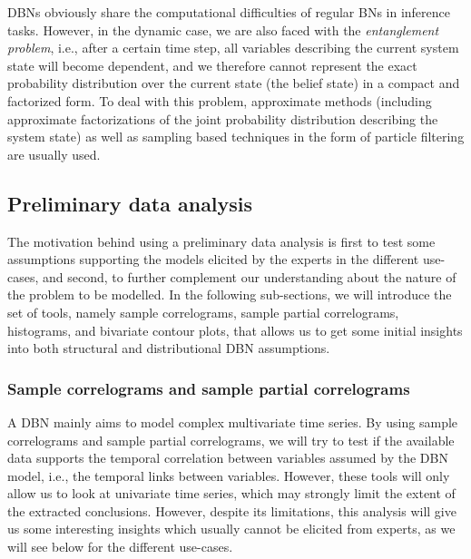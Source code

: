 DBNs obviously share the computational difficulties of regular BNs in inference tasks. However, in the dynamic case, we are also faced with the \textit{entanglement problem}, i.e., after a certain time step, all variables describing the current system state will become dependent, and we therefore cannot represent the exact probability distribution over the current state (the belief state) in a compact and factorized form. To deal with this problem, approximate methods (including approximate factorizations of the joint probability distribution describing the system state) \cite{BoyenKoller1998} as well as sampling based techniques in the form of particle filtering \cite{Doucet2000} are usually used.

\subsection{Preliminary data analysis}\label{SubSection:DataAnalysis}

The motivation behind using a preliminary data analysis is first to test some assumptions supporting the models elicited by the experts in the different use-cases, and second, to further complement our understanding about the nature of the problem to be modelled. In the following sub-sections, we will introduce the set of tools, namely sample correlograms, sample partial correlograms, histograms, and bivariate contour plots, that allows us to get some initial insights into both structural and distributional DBN assumptions.

\subsubsection{Sample correlograms and sample partial correlograms}

A DBN mainly aims to model complex multivariate time series. By using sample correlograms and sample partial correlograms, we will try to test if the available data supports the temporal correlation between variables assumed by the DBN model, i.e., the temporal links between variables. However, these tools will only allow us to look at univariate time series, which may strongly limit the extent of the extracted conclusions. However, despite its limitations, this analysis will give us some interesting insights which usually cannot be elicited from experts, as we will see below for the different use-cases.  

